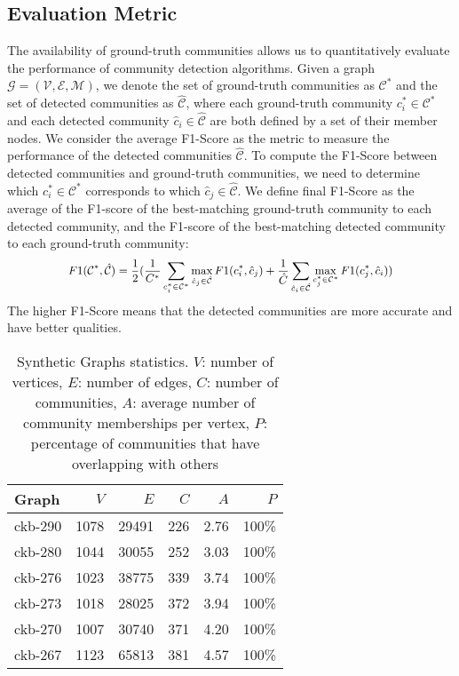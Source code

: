 \documentclass[sigconf]{acmart}
\begin{document}
\subsection{Evaluation Metric}
\label{subsection:evaluation metric}
The availability of ground-truth communities allows us to quantitatively evaluate the performance of community detection algorithms.
Given a graph $\mathcal{G} = (\mathcal{V}, \mathcal{E}, \mathcal{M})$, we denote the set of ground-truth communities as $\mathcal{C}^*$ and the set of detected communities as $\hat{\mathcal{C}}$, where each ground-truth community $c^*_i \in \mathcal{C}^*$ and each detected community $\hat{c}_i \in \hat{\mathcal{C}}$ are both defined by a set of their member nodes.
We consider the average F1-Score as the metric to measure the performance of the detected communities $\hat{\mathcal{C}}$.
To compute the F1-Score between detected communities and ground-truth communities, we need to determine which $c^*_i \in \mathcal{C}^*$ corresponds to which $\hat{c}_j \in \hat{\mathcal{C}}$.
We define final F1-Score as the average of the F1-score of the best-matching ground-truth community to each detected community, and the F1-score of the best-matching detected community to each ground-truth community:
\begin{equation}
\small
\begin{aligned}
  F1(\mathcal{C}^*, \hat{\mathcal{C}}) = \frac{1}{2}(\frac{1}{C^*}\sum_{c^*_i \in \mathcal{C}^*}\max_{\hat{c}_j \in \hat{\mathcal{C}}} F1(c^*_i, \hat{c}_j) + \frac{1}{\hat{C}}\sum_{\hat{c}_i \in \hat{\mathcal{C}}}\max_{c^*_j \in \mathcal{C}^*} F1(c^*_j, \hat{c}_i))
\end{aligned}
\end{equation}
The higher F1-Score means that the detected communities are more accurate and have better qualities.

\begin{table}[tbp]
\centering
\caption{Synthetic Graphs statistics. $V$: number of vertices, $E$: number of edges, $C$: number of communities, $A$: average number of community memberships per vertex, $P$: percentage of communities that have overlapping with others}
\label{tab:synthetic-dataset-statistics}
\begin{tabular}{l||r|r|r|r|r}
Graph   & $V$  & $E$   & $C$ & $A$  & $P$   \\
\hline
\hline
ckb-290 & 1078 & 29491 & 226 & 2.76 & 100\% \\
ckb-280 & 1044 & 30055 & 252 & 3.03 & 100\% \\
ckb-276 & 1023 & 38775 & 339 & 3.74 & 100\% \\
ckb-273 & 1018 & 28025 & 372 & 3.94 & 100\% \\
ckb-270 & 1007 & 30740 & 371 & 4.20 & 100\% \\
ckb-267 & 1123 & 65813 & 381 & 4.57 & 100\% 
\end{tabular}
\end{table}
\end{document}
